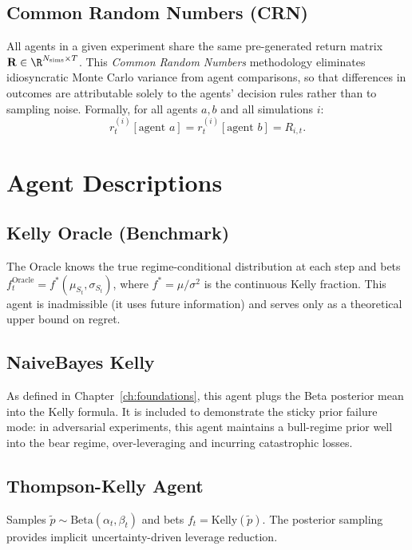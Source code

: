 \subsection{Common Random Numbers (CRN)}

All agents in a given experiment share the same pre-generated return matrix
$\mathbf{R} \in \R^{N_{\text{sims}} \times T}$. This \emph{Common Random
Numbers} methodology eliminates idiosyncratic Monte Carlo variance from
agent comparisons, so that differences in outcomes are attributable
solely to the agents' decision rules rather than to sampling noise.
Formally, for all agents $a, b$ and all simulations $i$:
\[
    r_t^{(i)}[\text{agent } a] = r_t^{(i)}[\text{agent }b] = R_{i,t}.
\]

\section{Agent Descriptions}
\label{sec:agents}

\subsection{Kelly Oracle (Benchmark)}

The Oracle knows the true regime-conditional distribution at each step
and bets $f_t^{\text{Oracle}} = f^*(\mu_{S_t}, \sigma_{S_t})$, where
$f^* = \mu/\sigma^2$ is the continuous Kelly fraction. This agent is
inadmissible (it uses future information) and serves only as a theoretical
upper bound on regret.

\subsection{NaiveBayes Kelly}

As defined in Chapter~\ref{ch:foundations}, this agent plugs the Beta
posterior mean into the Kelly formula. It is included to demonstrate the
sticky prior failure mode: in adversarial experiments, this agent
maintains a bull-regime prior well into the bear regime, over-leveraging
and incurring catastrophic losses.

\subsection{Thompson-Kelly Agent}

Samples $\tilde{p} \sim \text{Beta}(\alpha_t, \beta_t)$ and bets
$f_t = \text{Kelly}(\tilde{p})$. The posterior sampling provides implicit
uncertainty-driven leverage reduction.

